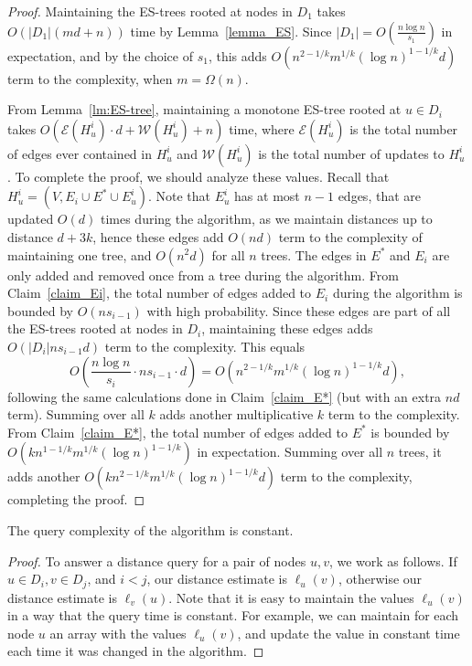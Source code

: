 \begin{proof}
Maintaining the ES-trees rooted at nodes in $D_1$ takes $O(|D_1|(md+n))$ time by Lemma~\ref{lemma_ES}. 
Since $|D_1| = O(\frac{n\log{n}}{s_1})$ in expectation, and by the choice of $s_1$, this adds $O(n^{2-1/k}m^{1/k}(\log{n})^{1-1/k} d)$ term to the complexity, when $m=\Omega(n)$. 

From Lemma~\ref{lm:ES-tree}, maintaining a monotone ES-tree rooted at $u \in D_i$ takes $O(\mathcal E(H_u^i)\cdot d+\mathcal W(H_u^i)+n)$ time, where $\mathcal E(H_u^i)$ is the total number of edges ever contained in $H_u^i$ and $\mathcal W(H_u^i)$ is the total number of updates to $H_u^i$. To complete the proof, we should analyze these values. Recall that $H_u^i=(V, E_i \cup E^* \cup E_u^i)$. Note that $E_u^i$ has at most $n-1$ edges, that are updated $O(d)$ times during the algorithm, as we maintain distances up to distance $d+3k$, hence these edges add $O(nd)$ term to the complexity of maintaining one tree, and $O(n^2 d)$ for all $n$ trees. The edges in $E^*$ and $E_i$ are only added and removed once from a tree during the algorithm. From Claim~\ref{claim_Ei}, the total number of edges added to $E_i$ during the algorithm is bounded by $O(ns_{i-1})$ with high probability. Since these edges are part of all the ES-trees rooted at nodes in $D_i$, maintaining these edges adds $O(|D_i| n s_{i-1} d)$ term to the complexity.
This equals $$O \left( \frac{n \log{n}}{s_i} \cdot n s_{i-1} \cdot d \right) = O( n^{2-1/k}m^{1/k}(\log{n})^{1-1/k} d),$$ following the same calculations done in Claim~\ref{claim_E*} (but with an extra $nd$ term). Summing over all $k$ adds another multiplicative $k$ term to the complexity.
From Claim~\ref{claim_E*}, the total number of edges added to $E^*$ is bounded by $O(kn^{1-1/k}m^{1/k}(\log{n})^{1-1/k})$ in expectation. Summing over all $n$ trees, it adds another $O( kn^{2-1/k}m^{1/k}(\log{n})^{1-1/k} d)$ term to the complexity, completing the proof.
\end{proof}

\begin{claim}
The query complexity of the algorithm is constant.
\end{claim}

\begin{proof}
To answer a distance query for a pair of nodes $u,v$, we work as follows. If $u \in D_i, v \in D_j$, and $i<j$, our distance estimate is $\ell_u(v)$, otherwise our distance estimate is $\ell_v(u)$. Note that it is easy to maintain the values $\ell_u(v)$ in a way that the query time is constant. For example, we can maintain for each node $u$ an array with the values $\ell_u(v)$, and update the value in constant time each time it was changed in the algorithm.
\end{proof}


